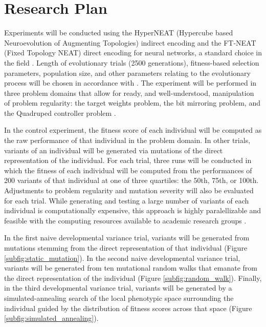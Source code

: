 \section{Research Plan}

Experiments will be conducted using the HyperNEAT (Hypercube based Neuroevolution of Augmenting Topologies) indirect encoding and the FT-NEAT (Fixed Topology NEAT) direct encoding for neural networks, a standard choice in the field \autocite{Stanley2009ANetworks,Clune2011OnRegularity}. Length of evolutionary trials (2500 generations), fitness-based selection parameters, population size, and other parameters relating to the evolutionary process will be chosen in accordance with \autocite{Clune2011OnRegularity}. The experiment will be performed in three problem domains that allow for ready, and well-understood, manipulation of problem regularity: the target weights problem, the bit mirroring problem, and the Quadruped controller problem \autocite{Clune2011OnRegularity}. 

In the control experiment, the fitness score of each individual will be computed as the raw performance of that individual in the problem domain. In other trials, variants of an individual will be generated via mutations of the direct representation of the individual. For each trial, three runs will be conducted in which the fitness of each individual will be computed from the performances of 200 variants of that individual at one of three quartiles: the 50th, 75th, or 100th. Adjustments to problem regularity and mutation severity will also be evaluated for each trial. While generating and testing a large number of variants of each individual is computationally expensive, this approach is highly paralellizable and feasible with the computing resources available to academic research groups \autocite{Mengistu2016EvolvabilityIt}.

In the first naive developmental variance trial, variants will be generated from mutations stemming from the direct representation of that individual (Figure \ref{subfig:static_mutation}). In the second naive developmental variance trial, variants will be generated from ten mutational random walks that emanate from the direct representation of the individual (Figure \ref{subfig:random_walk}). Finally, in the third developmental variance trial, variants will be generated by a simulated-annealing search of the local phenotypic space surrounding the individual guided by the distribution of fitness scores across that space (Figure \ref{subfig:simulated_annealing}). 

